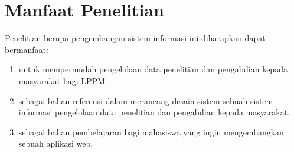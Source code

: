 
		

\section{Manfaat Penelitian}

Penelitian berupa pengembangan sistem informasi ini diharapkan dapat bermanfaat:

\begin{enumerate}
	\item untuk mempermudah pengelolaan data penelitian dan pengabdian kepada masyarakat
	bagi LPPM.
	\item sebagai bahan referensi dalam merancang desain sistem sebuah sistem 
	informasi pengelolaan data penelitian dan pengabdian kepada masyarakat.
	\item sebagai bahan pembelajaran bagi mahasiswa yang ingin mengembangkan
	sebuah aplikasi web.
\end{enumerate}


